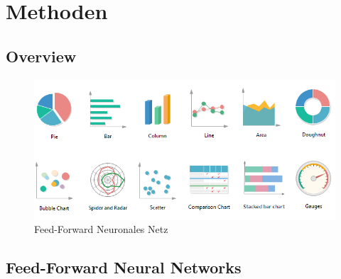 \documentclass[12pt]{article}
\begin{document}
    \newpage \section{Methoden}

        \subsection{Overview}

           
            
            \begin{figure}[htp]
            
                \begin{center}

                    \includegraphics[scale=0.5]{types-of-graphs.png}
                    \caption{Feed-Forward Neuronales Netz \cite{bishop1995}}
        
                \end{center}
                
            \end{figure}
        
            

        \subsection{Feed-Forward Neural Networks}

          
            
\end{document}
